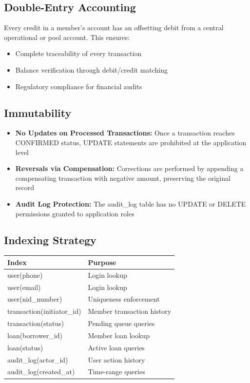 \documentclass[11pt,a4paper]{article}
\begin{document}
\subsection{Double-Entry Accounting}
Every credit in a member's account has an offsetting debit from a central operational or pool account. This ensures:
\begin{itemize}
    \item Complete traceability of every transaction
    \item Balance verification through debit/credit matching
    \item Regulatory compliance for financial audits
\end{itemize}

\subsection{Immutability}
\begin{itemize}
    \item \textbf{No Updates on Processed Transactions:} Once a transaction reaches CONFIRMED status, UPDATE statements are prohibited at the application level
    \item \textbf{Reversals via Compensation:} Corrections are performed by appending a compensating transaction with negative amount, preserving the original record
    \item \textbf{Audit Log Protection:} The audit\_log table has no UPDATE or DELETE permissions granted to application roles
\end{itemize}

\subsection{Indexing Strategy}

\begin{tabular}{@{}p{4cm}p{9cm}@{}}
\toprule
\textbf{Index} & \textbf{Purpose} \\
\midrule
user(phone) & Login lookup \\
user(email) & Login lookup \\
user(nid\_number) & Uniqueness enforcement \\
transaction(initiator\_id) & Member transaction history \\
transaction(status) & Pending queue queries \\
loan(borrower\_id) & Member loan lookup \\
loan(status) & Active loan queries \\
audit\_log(actor\_id) & User action history \\
audit\_log(created\_at) & Time-range queries \\
\bottomrule
\end{tabular}
\end{document}

